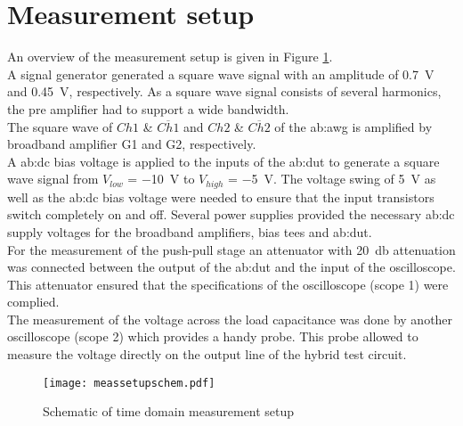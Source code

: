 \section{Measurement setup}
An overview of the measurement setup is given in Figure \ref{fig:SchematicMeasSetup}.\\
A signal generator generated a square wave signal with an amplitude of \SI{0.7}{\volt} and \SI{0.45}{\volt}, respectively.
As a square wave signal consists of several harmonics, the pre amplifier had to support a wide bandwidth.\\
The square wave of $Ch1$ \& $\overline{Ch1}$ and $Ch2$ \& $\overline{Ch2}$ of the \gls{ab:awg} is amplified by broadband amplifier G1 and G2, respectively.\\
A \gls{ab:dc} bias voltage is applied to the inputs of the \gls{ab:dut} to generate a square wave signal from $V_{low}$ = \SI{-10}{\volt} to $V_{high}$ = \SI{-5}{\volt}.
The voltage swing of \SI{5}{\volt} as well as the \gls{ab:dc} bias voltage were needed to ensure that the input transistors switch completely on and off.
Several power supplies provided the necessary \gls{ab:dc} supply voltages for the broadband amplifiers, bias tees and \gls{ab:dut}.\\
For the measurement of the push-pull stage an attenuator with \SI{20}{\decibel} attenuation was connected between the output of the \gls{ab:dut} and the input of the oscilloscope.
This attenuator ensured that the specifications of the oscilloscope (scope 1) were complied.\\
The measurement of the voltage across the load capacitance was done by another oscilloscope (scope 2) which provides a handy probe.
This probe allowed to measure the voltage directly on the output line of the hybrid test circuit.


\begin{figure}[htb!]
	\centering
  \texttt{[image: meassetupschem.pdf]}
	\caption{Schematic of time domain measurement setup}
	\label{fig:SchematicMeasSetup}
\end{figure}

